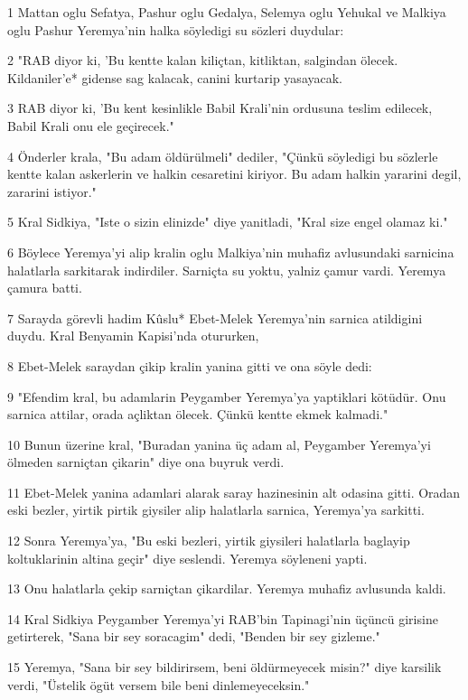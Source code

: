 \par 1 Mattan oglu Sefatya, Pashur oglu Gedalya, Selemya oglu Yehukal ve Malkiya oglu Pashur Yeremya'nin halka söyledigi su sözleri duydular:
\par 2 "RAB diyor ki, 'Bu kentte kalan kiliçtan, kitliktan, salgindan ölecek. Kildaniler'e* gidense sag kalacak, canini kurtarip yasayacak.
\par 3 RAB diyor ki, 'Bu kent kesinlikle Babil Krali'nin ordusuna teslim edilecek, Babil Krali onu ele geçirecek."
\par 4 Önderler krala, "Bu adam öldürülmeli" dediler, "Çünkü söyledigi bu sözlerle kentte kalan askerlerin ve halkin cesaretini kiriyor. Bu adam halkin yararini degil, zararini istiyor."
\par 5 Kral Sidkiya, "Iste o sizin elinizde" diye yanitladi, "Kral size engel olamaz ki."
\par 6 Böylece Yeremya'yi alip kralin oglu Malkiya'nin muhafiz avlusundaki sarnicina halatlarla sarkitarak indirdiler. Sarniçta su yoktu, yalniz çamur vardi. Yeremya çamura batti.
\par 7 Sarayda görevli hadim Kûslu* Ebet-Melek Yeremya'nin sarnica atildigini duydu. Kral Benyamin Kapisi'nda otururken,
\par 8 Ebet-Melek saraydan çikip kralin yanina gitti ve ona söyle dedi:
\par 9 "Efendim kral, bu adamlarin Peygamber Yeremya'ya yaptiklari kötüdür. Onu sarnica attilar, orada açliktan ölecek. Çünkü kentte ekmek kalmadi."
\par 10 Bunun üzerine kral, "Buradan yanina üç adam al, Peygamber Yeremya'yi ölmeden sarniçtan çikarin" diye ona buyruk verdi.
\par 11 Ebet-Melek yanina adamlari alarak saray hazinesinin alt odasina gitti. Oradan eski bezler, yirtik pirtik giysiler alip halatlarla sarnica, Yeremya'ya sarkitti.
\par 12 Sonra Yeremya'ya, "Bu eski bezleri, yirtik giysileri halatlarla baglayip koltuklarinin altina geçir" diye seslendi. Yeremya söyleneni yapti.
\par 13 Onu halatlarla çekip sarniçtan çikardilar. Yeremya muhafiz avlusunda kaldi.
\par 14 Kral Sidkiya Peygamber Yeremya'yi RAB'bin Tapinagi'nin üçüncü girisine getirterek, "Sana bir sey soracagim" dedi, "Benden bir sey gizleme."
\par 15 Yeremya, "Sana bir sey bildirirsem, beni öldürmeyecek misin?" diye karsilik verdi, "Üstelik ögüt versem bile beni dinlemeyeceksin."
